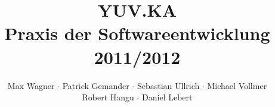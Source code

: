 \documentclass{scrartcl}
\begin{document}
\title{\Huge{YUV.KA} \\ \large{Praxis der Softwareentwicklung 2011/2012}}
\author{Max Wagner $\cdot$ Patrick Gemander $\cdot$ Sebastian Ullrich $\cdot$ Michael Vollmer \\ Robert Hangu $\cdot$ Daniel Lebert}
\maketitle

\newpage
\mbox{}
\newpage
\mbox{}

\tableofcontents













\end{document}
